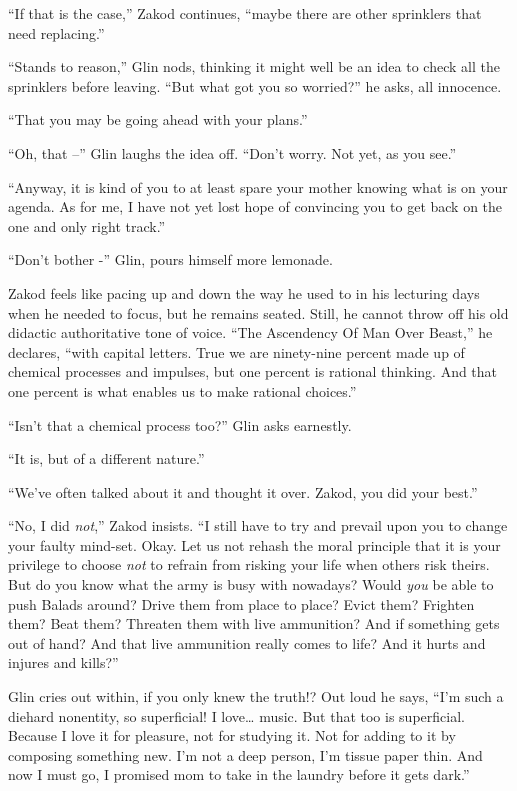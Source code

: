 \documentclass[twoside,11pt]{book}
\begin{document}
``If that is the case,'' Zakod continues, ``maybe there are other sprinklers that need replacing.''

``Stands to reason,'' Glin nods, thinking it might well be an idea to check all the sprinklers
before leaving. ``But what got you so worried?'' he asks, all innocence.

``That you may be going ahead with your plans.''

``Oh, that --'' Glin laughs the idea off. ``Don't worry. Not yet, as you
see.''

``Anyway, it is kind of you to at least spare your mother knowing what is on your agenda. As for me, I have
not yet lost hope of convincing you to get back on the one and only right track.''

``Don't bother -'' Glin, pours himself more lemonade.

Zakod feels like pacing up and down the way he used to in his lecturing days when he needed to focus, but he remains
seated. Still, he cannot throw off his old didactic authoritative tone of voice. ``The Ascendency Of Man
Over Beast,'' he declares, ``with capital letters. True we are ninety-nine percent made up of chemical
processes and impulses, but one percent is rational thinking. And that one percent is what enables us to make rational
choices.''

``Isn't that a chemical process too?'' Glin asks
earnestly.

``It is, but of a different nature.''

``We've often talked about it and thought it over. Zakod, you did your best.''

``No, I did \textit{not},'' Zakod insists. ``I still have to try and prevail upon
you to change your faulty mind-set. Okay. Let us not rehash the moral principle that it is your privilege to choose
\textit{not} to refrain from risking your life when others risk theirs. But do you know what the army is busy with
nowadays? Would \textit{you} be able to push Balads around? Drive them from place to place? Evict them? Frighten them?
Beat them? Threaten them with live ammunition? And if something gets out of hand? And that live ammunition really comes
to life? And it hurts and injures and kills?''

Glin cries out within, if you only knew the truth!? Out loud he says, ``I'm such a diehard nonentity, so
superficial! I love{\dots} music. But that too is superficial. Because I love it for pleasure, not for studying it. Not
for adding to it by composing something new. I'm not a deep person, I'm tissue paper thin. And now I must go, I
promised mom to take in the laundry before it gets dark.''
\end{document}
